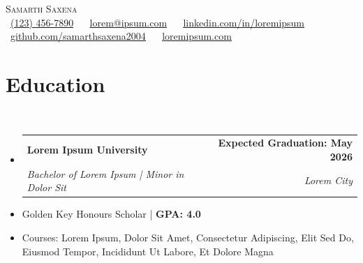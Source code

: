 \documentclass[letterpaper,11pt]{article}
\makeatletter
\newcommand{\resumeItem}[1]{
  \item\small{
    {#1 \vspace{0pt}}
  }
}
\newcommand{\resumeSubheading}[4]{
  \vspace{-2pt}\item
    \begin{tabular*}{1.0\textwidth}[t]{l@{\extracolsep{\fill}}r}
      \textbf{#1} & \textbf{\small #2} \\
      \textit{\small#3} & \textit{\small #4} \\
    \end{tabular*}\vspace{-7pt}
}
\newcommand{\resumeSubHeadingListStart}{\begin{itemize}[leftmargin=0.0in, label={}]}
\newcommand{\resumeSubHeadingListEnd}{\end{itemize}}\vspace{0pt}
\newcommand{\resumeItemListStart}{\begin{itemize}}
\newcommand{\resumeItemListEnd}{\end{itemize}\vspace{-5pt}}
\makeatother
\begin{document}
\begin{center}
    {\Large \scshape Samarth Saxena} \\[2mm]
    \footnotesize \raisebox{-0.1\height}
    \faPhone\ \underline{(123) 456-7890} ~ 
    {\faEnvelope\  \underline{lorem@ipsum.com}} ~ 
    {\faLinkedin\ \underline{\href{https://linkedin.com/in/loremipsum}{linkedin.com/in/loremipsum}}} ~
    {\faGithub\ \underline{\href{https://github.com/samarthsaxena2004}{github.com/samarthsaxena2004}}} ~
    {\faBriefcase\ \underline{\href{https://loremipsum.com/}{loremipsum.com}}}
    \vspace{-8pt}
\end{center}

\section{Education} \\[1mm]
  \resumeSubHeadingListStart
    \resumeSubheading
      {Lorem Ipsum University}{Expected Graduation: May 2026}
      {Bachelor of Lorem Ipsum | Minor in Dolor Sit
      }{Lorem City}
  \resumeSubHeadingListEnd
    \resumeItemListStart
        \resumeItem {Golden Key Honours Scholar | \textbf{GPA: 4.0}}
        \vspace{-7pt}
        \resumeItem {Courses: Lorem Ipsum, Dolor Sit Amet, Consectetur Adipiscing, Elit Sed Do, Eiusmod Tempor, Incididunt Ut Labore, Et Dolore Magna}
    \resumeItemListEnd
    \vspace{-12pt}
\end{document}

